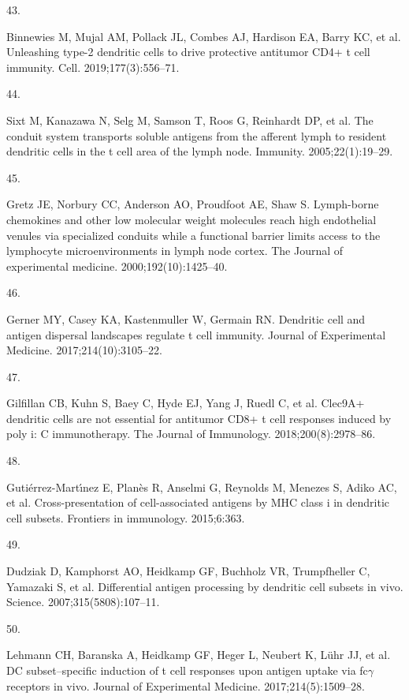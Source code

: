 \documentclass[
]{article}
\newlength{\cslhangindent}
\newlength{\csllabelwidth}
\newenvironment{CSLReferences}[2] %
 {\begin{list}{}{%
  \setlength{\itemindent}{0pt}
  \setlength{\leftmargin}{0pt}
  \setlength{\parsep}{0pt}
  \ifodd #1
   \setlength{\leftmargin}{\cslhangindent}
   \setlength{\itemindent}{-1\cslhangindent}
  \fi
  \setlength{\itemsep}{#2\baselineskip}}}
 {\end{list}}
\newcommand{\CSLLeftMargin}[1]{\parbox[t]{\csllabelwidth}{\strut#1\strut}}
\newcommand{\CSLRightInline}[1]{\parbox[t]{\linewidth - \csllabelwidth}{\strut#1\strut}}
\begin{document}
\begin{CSLReferences}{0}{1}
\CSLLeftMargin{43. }%
\CSLRightInline{Binnewies M, Mujal AM, Pollack JL, Combes AJ, Hardison
EA, Barry KC, et al. Unleashing type-2 dendritic cells to drive
protective antitumor CD4+ t cell immunity. Cell. 2019;177(3):556--71. }

\CSLLeftMargin{44. }%
\CSLRightInline{Sixt M, Kanazawa N, Selg M, Samson T, Roos G, Reinhardt
DP, et al. The conduit system transports soluble antigens from the
afferent lymph to resident dendritic cells in the t cell area of the
lymph node. Immunity. 2005;22(1):19--29. }

\CSLLeftMargin{45. }%
\CSLRightInline{Gretz JE, Norbury CC, Anderson AO, Proudfoot AE, Shaw S.
Lymph-borne chemokines and other low molecular weight molecules reach
high endothelial venules via specialized conduits while a functional
barrier limits access to the lymphocyte microenvironments in lymph node
cortex. The Journal of experimental medicine. 2000;192(10):1425--40. }

\CSLLeftMargin{46. }%
\CSLRightInline{Gerner MY, Casey KA, Kastenmuller W, Germain RN.
Dendritic cell and antigen dispersal landscapes regulate t cell
immunity. Journal of Experimental Medicine. 2017;214(10):3105--22. }

\CSLLeftMargin{47. }%
\CSLRightInline{Gilfillan CB, Kuhn S, Baey C, Hyde EJ, Yang J, Ruedl C,
et al. Clec9A+ dendritic cells are not essential for antitumor CD8+ t
cell responses induced by poly i: C immunotherapy. The Journal of
Immunology. 2018;200(8):2978--86. }

\CSLLeftMargin{48. }%
\CSLRightInline{Gutiérrez-Martı́nez E, Planès R, Anselmi G, Reynolds M,
Menezes S, Adiko AC, et al. Cross-presentation of cell-associated
antigens by MHC class i in dendritic cell subsets. Frontiers in
immunology. 2015;6:363. }

\CSLLeftMargin{49. }%
\CSLRightInline{Dudziak D, Kamphorst AO, Heidkamp GF, Buchholz VR,
Trumpfheller C, Yamazaki S, et al. Differential antigen processing by
dendritic cell subsets in vivo. Science. 2007;315(5808):107--11. }

\CSLLeftMargin{50. }%
\CSLRightInline{Lehmann CH, Baranska A, Heidkamp GF, Heger L, Neubert K,
Lühr JJ, et al. DC subset--specific induction of t cell responses upon
antigen uptake via fc\(\gamma\) receptors in vivo. Journal of
Experimental Medicine. 2017;214(5):1509--28. }


\end{CSLReferences}
\end{document}

